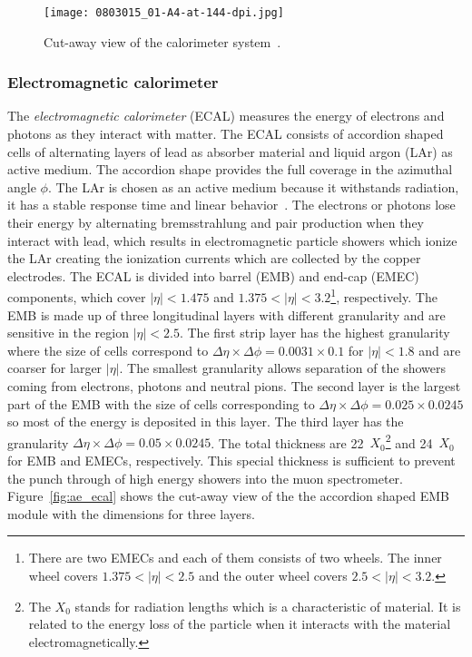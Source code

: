 \begin{figure}[htbp]
    \begin{center}
        \texttt{[image: 0803015\_01-A4-at-144-dpi.jpg]}
        \caption{Cut-away view of the calorimeter system~\cite{Aad:2008zzm}.}
        \label{fig:ae_calorimeter}
    \end{center}
\end{figure}


\subsubsection{Electromagnetic calorimeter}
\label{subsubsec:ae_ecal}
The \textit{electromagnetic calorimeter} (ECAL) measures the energy of electrons and photons as they interact with matter.
The ECAL consists of accordion shaped cells of alternating layers of lead as absorber material and liquid argon (LAr) as active medium.
The accordion shape provides the full coverage in the azimuthal angle $\phi$.
The LAr is chosen as an active medium because it withstands radiation, it has a stable response time and linear behavior~\cite{Aad:2008zzm}.
The electrons or photons lose their energy by alternating bremsstrahlung and pair production when they interact with lead, which results in electromagnetic particle showers which ionize the LAr creating the ionization currents which are collected by the copper electrodes.
The ECAL is divided into barrel (EMB) and end-cap (EMEC) components, which cover $|\eta| < 1.475$ and $1.375 < |\eta| < 3.2$\footnote{There are two EMECs and each of them consists of two wheels. The inner wheel covers $1.375 < |\eta| < 2.5$ and the outer wheel covers $2.5 < |\eta| < 3.2$.}, respectively.
The EMB is made up of three longitudinal layers with different granularity and are sensitive in the region $|\eta| < 2.5$.
The first strip layer has the highest granularity where the size of cells correspond to $\Delta \eta \times \Delta \phi = 0.0031 \times 0.1$ for $|\eta| < 1.8$ and are coarser for larger $|\eta|$.
The smallest granularity allows separation of the showers coming from electrons, photons and neutral pions.
The second layer is the largest part of the EMB with the size of cells corresponding to $\Delta \eta \times \Delta \phi = 0.025 \times 0.0245$ so most of the energy is deposited in this layer.
The third layer has the granularity $\Delta \eta \times \Delta \phi = 0.05 \times 0.0245$.
The total thickness are 22~$X_{0}$\footnote{The $X_{0}$ stands for radiation lengths which is a characteristic of material. It is related to the energy loss of the particle when it interacts with the material electromagnetically.} and 24~$X_{0}$ for EMB and EMECs, respectively.
This special thickness is sufficient to prevent the punch through of high energy showers into the muon spectrometer.
Figure~\ref{fig:ae_ecal} shows the cut-away view of the the accordion shaped EMB module with the dimensions for three layers.

